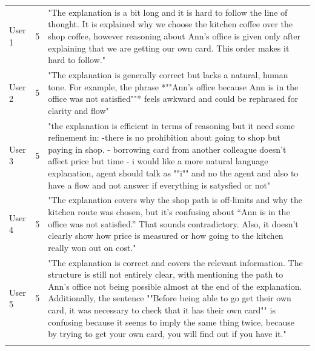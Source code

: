 \documentclass[sigconf,nonacm]{acmart}
\begin{document}
\begin{longtable}{l|l|p{15cm}}
        User 1 & 5 & "The explanation is a bit long and it is hard to follow the line of thought. It is explained why we choose the
kitchen coffee over the shop coffee, however reasoning about Ann's office is given only after explaining that we
are getting our own card. This order makes it hard to follow." \\
        User 2 & 5 & "The explanation is generally correct but lacks a natural, human tone. For example, the phrase *""Ann's
office because Ann is in the office was not satisfied""* feels awkward and could be rephrased for clarity and
flow" \\
        User 3 & 5 & "the explanation is efficient in terms of reasoning but it need some refinement in:
-there is no prohibition about going to shop but paying in shop.
- borrowing card from another colleague doesn't affect price but time
- i would like a more natural language explanation, agent should talk as ""i"" and no the agent and also to have a
flow and not answer if everything is satysfied or not" \\
        User 4 & 5 & "The explanation covers why the shop path is off-limits and why the kitchen route was chosen, but it’s
confusing about “Ann is in the office was not satisfied.” That sounds contradictory. Also, it doesn’t clearly show
how price is measured or how going to the kitchen really won out on cost." \\
        User 5 & 5 & "The explanation is correct and covers the relevant information. The structure is still not entirely clear, with
mentioning the path to Ann's office not being possible almost at the end of the explanation. Additionally, the
sentence ""Before being able to go get their own card, it was necessary to check that it has their own card"" is
confusing because it seems to imply the same thing twice, because by trying to get your own card, you will find
out if you have it." \\

    \label{tab:comments}

\end{longtable}

\twocolumn



\end{document}
